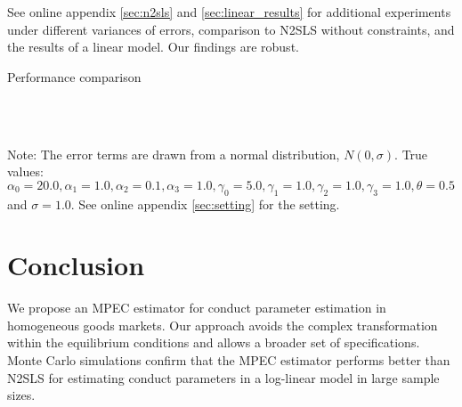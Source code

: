 \documentclass[11pt, a4paper]{article}
\begin{document}
See online appendix \ref{sec:n2sls} and \ref{sec:linear_results} for additional experiments under different variances of errors, comparison to N2SLS without constraints, and the results of a linear model. 
Our findings are robust.

\begin{table}[!htbp]
  \begin{center}
      \caption{Performance comparison}
      \label{tb:loglinear_loglinear_sigma_1_simultaneous_non_constraint_theta_constraint_bias_rmse} 
    \\
    \subfloat[MPEC ]{}\\
  \end{center}
  \footnotesize
  Note: The error terms are drawn from a normal distribution, $N(0, \sigma)$. True values: $\alpha_0=20.0,\alpha_1=1.0,\alpha_2=0.1,\alpha_3=1.0,\gamma_0=5.0,\gamma_1=1.0,\gamma_2=1.0,\gamma_3=1.0,\theta=0.5$ and $\sigma=1.0$. See online appendix \ref{sec:setting} for the setting.
\end{table} 



\section{Conclusion}
We propose an MPEC estimator for conduct parameter estimation in homogeneous goods markets.
Our approach avoids the complex transformation within the equilibrium conditions and allows a broader set of specifications. 
Monte Carlo simulations confirm that the MPEC estimator performs better than N2SLS for estimating conduct parameters in a log-linear model in large sample sizes. 
\end{document}
